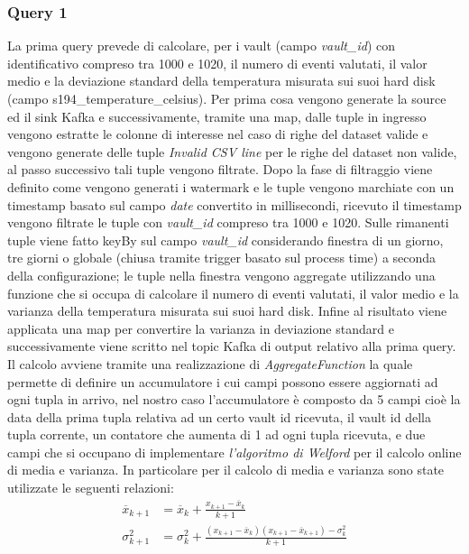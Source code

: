 \documentclass[conference]{IEEEtran}
\begin{document}
\subsubsection{Query 1}
La prima query prevede di calcolare, per i vault (campo \textit{vault\_id}) con identificativo compreso tra 1000 e 1020,  il numero di eventi valutati, il valor medio e la deviazione standard della temperatura misurata sui suoi hard disk (campo s194\_temperature\_celsius). Per prima cosa vengono generate la source ed il sink Kafka e successivamente, tramite una map, dalle tuple in ingresso vengono estratte le colonne di interesse nel caso di righe del dataset valide e vengono generate delle tuple \textit{Invalid CSV line} per le righe del dataset non valide, al passo successivo tali tuple vengono filtrate. Dopo la fase di filtraggio viene definito come vengono generati i watermark e le tuple vengono marchiate con un timestamp basato sul campo \textit{date} convertito in millisecondi, ricevuto il timestamp vengono filtrate le tuple con \textit{vault\_id} compreso tra 1000 e 1020.
Sulle rimanenti tuple viene fatto keyBy sul campo \textit{vault\_id} considerando finestra di un giorno, tre giorni o globale (chiusa tramite trigger basato sul process time) a seconda della configurazione; le tuple nella finestra vengono aggregate utilizzando una funzione che si occupa di calcolare il numero di eventi valutati, il valor medio e la varianza della temperatura misurata sui suoi hard disk. Infine al risultato viene applicata una map per convertire la varianza in deviazione standard e successivamente viene scritto nel topic Kafka di output relativo alla prima query. Il calcolo avviene tramite una realizzazione di \textit{AggregateFunction} la quale permette di definire un accumulatore i cui campi possono essere aggiornati ad ogni tupla in arrivo, nel nostro caso l'accumulatore è composto da 5 campi cioè la data della prima tupla relativa ad un certo vault id ricevuta, il vault id della tupla corrente, un contatore che aumenta di 1 ad ogni tupla ricevuta, e due campi che si occupano di implementare \textit{l'algoritmo di Welford}\cite{b1} per il calcolo online di media e varianza.
In particolare per il calcolo di media e varianza sono state utilizzate le seguenti relazioni:
\begin{equation}
    \begin{aligned}
        \overline{x}_{k+1} &= \overline{x}_k + \frac{x_{k+1} - \overline{x}_k}{k+1} \\
        \sigma^2_{k+1} &= \sigma^2_k + \frac{(x_{k+1} - \overline{x}_k)(x_{k+1} - \overline{x}_{k+1})-\sigma^2_k}{k+1}
    \end{aligned}
\end{equation}
\end{document}
